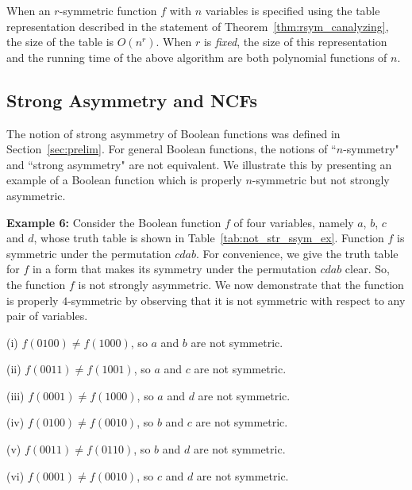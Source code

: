 When an $r$-symmetric function $f$ with $n$ variables is
specified using the table representation described in the
statement of Theorem~\ref{thm:rsym_canalyzing},
the size of the table is $O(n^r)$.
When $r$ is \emph{fixed}, the size of 
this representation and the running time 
of the above algorithm are both polynomial functions of $n$. 

\subsection{Strong Asymmetry and NCFs}
\label{sse:strong_asym_ncf}

The notion of strong asymmetry of Boolean functions was defined 
in Section~\ref{sec:prelim}.
For general Boolean functions, the notions of ``$n$-symmetry" and
``strong asymmetry" are not equivalent. 
We illustrate this by presenting an example of a Boolean function
which is properly $n$-symmetric but not strongly asymmetric.

\medskip

\noindent
\textbf{Example 6:}
Consider the Boolean function $f$ of four variables, 
namely $a$, $b$, $c$ and $d$,
whose truth table is shown in Table~\ref{tab:not_str_ssym_ex}.
Function $f$ is symmetric under the permutation $cdab$.
For convenience, we give the truth table for $f$ in a form
that makes its symmetry under the permutation $cdab$ clear.
So, the function $f$ is not strongly asymmetric.
We now demonstrate that the function is properly $4$-symmetric
by observing that it is not symmetric with respect to any pair of variables.

\medskip

\noindent
\begin{minipage}{0.01\textwidth}
\end{minipage}
\begin{minipage}{0.85\textwidth}
\begin{description}
\item{(i)} $f(0100) \neq f(1000)$, so $a$ and $b$ are not symmetric.
\item{(ii)} $f(0011) \neq f(1001)$, so $a$ and $c$ are not symmetric.
\item{(iii)} $f(0001) \neq f(1000)$, so $a$ and $d$ are not symmetric.
\item{(iv)} $f(0100) \neq f(0010)$, so $b$ and $c$ are not symmetric.
\item{(v)} $f(0011) \neq f(0110)$, so $b$ and $d$ are not symmetric.
\item{(vi)} $f(0001) \neq f(0010)$, so $c$ and $d$ are not symmetric.
\end{description}
\end{minipage}

